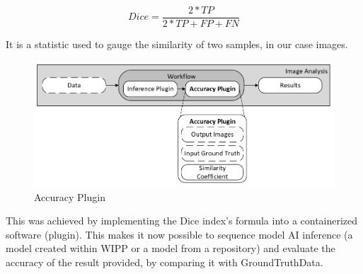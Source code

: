 \[ Dice = \frac{2*TP}{2*TP + FP + FN} \]

It is a statistic used to gauge the similarity of two samples, in
our case images.

\begin{figure}[H]
  \centering
  \includegraphics[width=1.0\linewidth]{png/methods/accuracy.png}
  \caption{Accuracy Plugin}
  \label{fig:4accuracy}
\end{figure}

This was achieved by implementing the Dice index's formula into a containerized
software (plugin). This makes it now possible to sequence model AI inference (a
model created within WIPP or a model from a repository) and evaluate the
accuracy of the result provided, by comparing it with
\Gls{GroundTruthData}.
